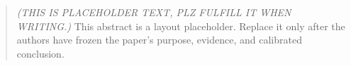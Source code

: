 \begin{abstract}
\textit{(THIS IS PLACEHOLDER TEXT, PLZ FULFILL IT WHEN WRITING.)}
This abstract is a layout placeholder. Replace it only after the authors have frozen the paper's purpose, evidence, and calibrated conclusion.
\end{abstract}
